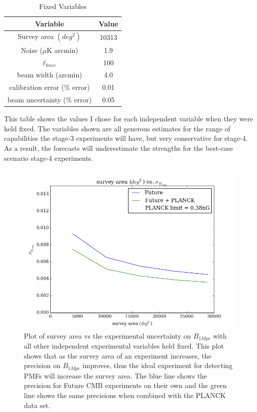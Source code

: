 \begin{table}[h]
\centering
\caption{Fixed Variables}

\label{my-label}
\begin{tabular}{l|l}
\multicolumn{1}{c}{Variable} & \multicolumn{1}{|c}{Value} \\ \hline
\multicolumn{1}{c}{Survey area $(deg^2)$} & \multicolumn{1}{|c}{10313}  \\
\multicolumn{1}{c}{Noise ($\mu$K arcmin)} & \multicolumn{1}{|c}{1.9}   \\
\multicolumn{1}{c}{$\ell_{knee}$} & \multicolumn{1}{|c}{100} \\
\multicolumn{1}{c}{beam width (arcmin)} & \multicolumn{1}{|c}{4.0}   \\
\multicolumn{1}{c}{calibration error (\% error)} & \multicolumn{1}{|c}{0.01} \\
\multicolumn{1}{c}{beam uncertainty (\% error)} & \multicolumn{1}{|c}{0.05}
\end{tabular}

\bigskip
\begin{flushleft}
This table shows the values I chose for each independent variable when they were held fixed. The variables shown are all generous estimates for the range of capabilities the stage-3 experiments will have, but very conservative for stage-4. As a result, the forecasts will underestimate the strengths for the best-case scenario stage-4 experiments.
\end{flushleft}
\end{table}



\begin{figure}[h]
\centering
\includegraphics[scale=0.8]{images/area.png}
\caption{Plot of survey area vs the experimental uncertainty on $B_{1Mpc}$ with all other independent experimental variables held fixed. This plot shows that as the survey area of an experiment increases, the precision on $B_{1Mpc}$ improves, thus the ideal experiment for detecting PMFs will increase the survey area. The blue line shows the precision for Future CMB experiments on their own and the green line shows the same precisions when combined with the PLANCK data set.}
\label{fig:area}
\end{figure}

